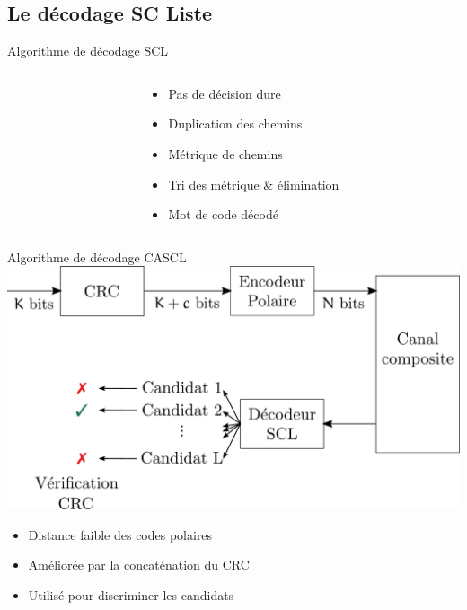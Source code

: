 \subsection*{Le décodage SC Liste}

\begin{frame}[c]{Algorithme de décodage SCL}
	\begin{columns}[T] %

		\begin{column}{.7\textwidth}


		\end{column}

		\begin{column}{.3\textwidth}
			\begin{itemize}
				\item<3-> Pas de décision dure
				\item<4-> Duplication des chemins
				\item<5-> Métrique de chemins
				\item<6-> Tri des métrique \& élimination
				\item<7-> Mot de code décodé
			\end{itemize}
		\end{column}

	\end{columns}
\end{frame}

\begin{frame}[c]{Algorithme de décodage CASCL}
			\includegraphics[width=\textwidth]{./fig/cascl}
			\begin{itemize}
				\item Distance faible des codes polaires
				\item Améliorée par la concaténation du CRC
				\item Utilisé pour discriminer les candidats
			\end{itemize}
\end{frame}

